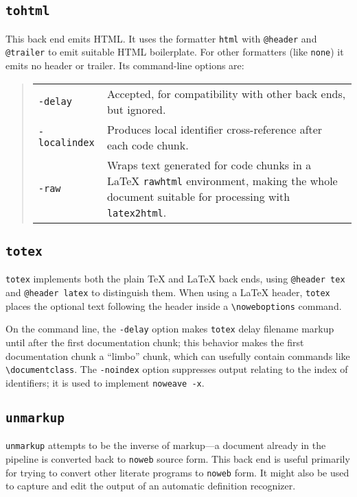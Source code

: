 \documentclass{article}
\makeatletter
\newcommand\kw[1]{\texttt{@#1}}
\makeatother
\begin{document}
\subsection{\tt tohtml}

This back end emits HTML.
It uses the formatter {\tt html} with \kw{header} and \kw{trailer} to
emit suitable HTML boilerplate.
For other formatters (like {\tt none}) it emits no header or trailer.
Its command-line options are:
\begin{quote}
\begin{tabularx}{\linewidth}{lX}
\tt -delay&Accepted, for compatibility with other back ends, but ignored.\\
\tt -localindex&Produces local identifier cross-reference after each code chunk.\\
\tt -raw&Wraps text generated for code chunks in a {\LaTeX} {\tt rawhtml}
environment, making the whole document suitable for processing with
{\tt latex2html}.\\
\end{tabularx}
\end{quote}


\subsection{\tt totex}

{\tt totex} implements both the plain {\TeX} and {\LaTeX} back ends,
using \kw{header tex} and \kw{header latex} to distinguish them.
When using a {\LaTeX} header, {\tt totex} places the optional text
following the header inside a \verb+\noweboptions+ command.

On the command line, the {\tt -delay} option makes {\tt totex} delay
filename markup until after the first documentation chunk; this
behavior makes the first documentation chunk a ``limbo''
chunk, which can usefully contain commands like \verb+\documentclass+.
The {\tt -noindex} option suppresses output relating to the index of
identifiers; it is used to implement {\tt noweave -x}.
{\hfuzz=1.2pt\par}

\subsection{\tt unmarkup}

{\tt unmarkup} attempts to  be the inverse of markup---a document
already in the pipeline is converted back to {\tt noweb} source form.
This back end is useful primarily for trying to convert other literate
programs to {\tt noweb} form.
It might also be used to capture and edit the output of an automatic
definition recognizer.
\end{document}
